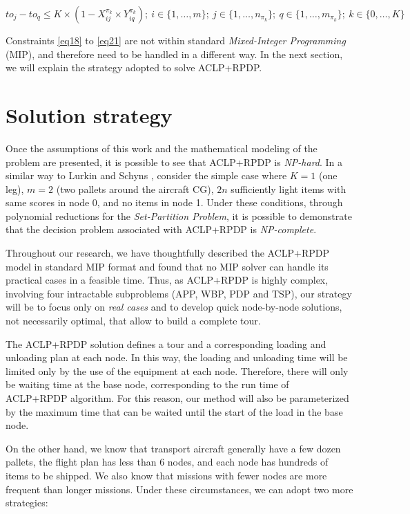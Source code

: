 \documentclass[preprint]{elsarticle}
\begin{document}
\begin{equation} \label{eq21}
	to_j - to_q \leq  K \times (1-X_{ij}^{\pi_k} \times Y_{iq}^{\pi_k}); \ i \in \{1, \ldots, m\}; \ j \in \{1, \ldots, n_{\pi_k}\}; \ q \in \{1, \ldots, m_{\pi_k}\}; \ k \in \{0, \ldots, K\}
\end{equation}

Constraints \ref{eq18} to \ref{eq21} are not within standard {\it Mixed-Integer Programming}\/ (MIP), and therefore need to be handled in a different way. In the next section, we will explain the strategy adopted to solve ACLP+RPDP.


\section{Solution strategy}
\label{sec5}

Once the assumptions of this work and the mathematical modeling of the problem are presented, it is possible to see that ACLP+RPDP is {\it NP-hard}. In a similar way to Lurkin and Schyns \cite[p. 6]{LurkinSchyns2015}, consider the simple case where $K=1$\/ (one leg), $m=2$\/ (two pallets around the aircraft CG), $2n$\/ sufficiently light items with same scores in node 0, and no items in node 1. Under these conditions, through polynomial reductions for the {\it Set-Partition Problem}, it is possible to demonstrate that the decision problem associated with ACLP+RPDP is {\it NP-complete}.

Throughout our research, we have thoughtfully described the ACLP+RPDP model in standard MIP format and found that no MIP solver can handle its practical cases in a feasible time. Thus, as ACLP+RPDP is highly complex, involving four intractable subproblems (APP, WBP, PDP and TSP), our strategy will be to focus only on {\it real cases}\/ and to develop quick node-by-node solutions, not necessarily optimal, that allow to build a complete tour.

The ACLP+RPDP solution defines a tour and a corresponding loading and unloading plan at each node. In this way, the loading and unloading time will be limited only by the use of the equipment at each node. Therefore, there will only be waiting time at the base node, corresponding to the run time of ACLP+RPDP algorithm. For this reason, our method will also be parameterized by the maximum time that can be waited until the start of the load in the base node.

On the other hand, we know that transport aircraft generally have a few dozen pallets, the flight plan has less than $6$\/ nodes, and each node has hundreds of items to be shipped. We also know that missions with fewer nodes are more frequent than longer missions. Under these circumstances, we can adopt two more strategies:
\end{document}
